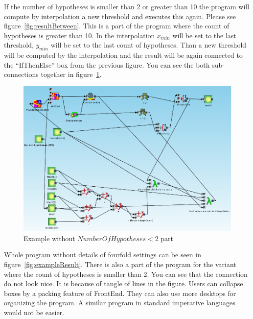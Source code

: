 \documentclass[a4paper,12pt]{book}
\begin{document}
If the number of hypotheses is smaller than 2 or greater than 10 the program will compute by interpolation a new threshold and executes this again. Please see figure~\ref{fig:resultBetween}. This is a part of the program where the count of hypotheses is greater than 10. In the interpolation $x_{min}$ will be set to the last threshold, $y_{min}$ will be set to the last count of hypotheses. Than a new threshold will be computed by the interpolation and the result will be again connected to the ``IfThenElse'' box from the previous figure. You can see the both sub-connections together in figure~\ref{fig:exampleWithoutInterpolationOnMax}.

\begin{figure}
	\includegraphics[width=1\textwidth]{exampleWithoutInterpolationOnMax}
	\caption{Example without $NumberOfHypotheses < 2$ part}
	\label{fig:exampleWithoutInterpolationOnMax}
\end{figure}

Whole program without details of fourfold settings can be seen in figure~\ref{fig:exampleResult}. There is also a part of the program for the variant where the count of hypotheses is smaller than 2. You can see that the connection do not look nice. It is because of tangle of lines in the figure. Users can collapse boxes by a packing feature of FrontEnd. They can also use more desktops for organizing the program. A similar program in standard imperative languages would not be easier.
\end{document}
